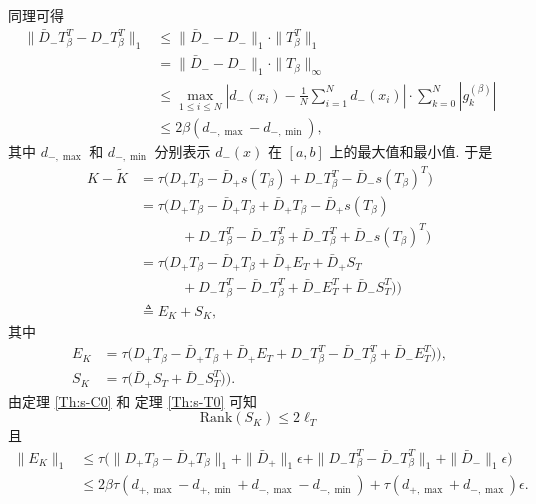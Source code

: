 \documentclass{ecnumaster}
\begin{document}
同理可得
\begin{align*}
  \|\bar{D}_- T_{\beta}^{T} - D_- T_{\beta}^{T}\|_1 
  & \leq \|\bar{D}_- - D_-\|_1\cdot \|T_{\beta}^{T}\|_1 \\
    &= \| \bar{D}_- - D_- \|_1\cdot \| T_{\beta}\|_\infty\\
    &\leq \max _{1 \leq i \leq N} 
     \left|d_{-}(x_i) - \frac{1}{N} \sum\limits _{i=1}^{N} d_{-}(x_i)\right|\cdot
        \sum\limits_{k=0}^{N} \left|g_k^{(\beta)}\right|\\
    &\leq 2\beta (d_{-,\max}-d_{-,\min}),
\end{align*}
其中 $d_{-,\max}$ 和 $d_{-,\min}$ 分别表示 $d_-(x)$
在 $[a,b]$ 上的最大值和最小值.
%
于是
\begin{align*}
  K-\tilde{K}
  & = \tau \Big(D_+ T_{\beta} - \bar{D}_+ s(T_{\beta})
         + D_- T_{\beta}^T - \bar{D}_- s(T_{\beta})^T\Big) \\
  & = \tau \Big(D_+ T_{\beta} - \bar{D}_+ T_{\beta} + \bar{D}_+ T_{\beta} - \bar{D}_+ s(T_{\beta}) \\
  & \quad\qquad  + D_- T_{\beta}^T - \bar{D}_- T_{\beta}^T + \bar{D}_- T_{\beta}^T + \bar{D}_- s(T_{\beta})^T\Big) \\
  & = \tau \Big(D_+ T_{\beta} - \bar{D}_+ T_{\beta} + \bar{D}_+ E_T + \bar{D}_+ S_T \\
  & \quad\qquad  + D_- T_{\beta}^T - \bar{D}_- T_{\beta}^T + \bar{D}_- E_T^T + \bar{D}_- S_T^T)\Big) \\
  & \triangleq E_K + S_K,
\end{align*}
其中 
\begin{align*}
  E_K & = \tau \Big(D_+ T_{\beta} - \bar{D}_+ T_{\beta} + \bar{D}_+ E_T
    + D_- T_{\beta}^T - \bar{D}_- T_{\beta}^T + \bar{D}_- E_T^T)\Big),\\
  S_K & = \tau \Big(\bar{D}_+ S_T + \bar{D}_- S_T^T)\Big).
\end{align*}
由定理 \ref{Th:s-C0} 和 定理 \ref{Th:s-T0} 可知 
$$ \mathrm{Rank}(S_K)\leq 2\ell_T $$
且 
\begin{align*}
  \|E_K\|_1 
  & \leq \tau\Big(\|D_+ T_{\beta} - \bar{D}_+ T_{\beta}\|_1
     + \|\bar{D}_+\|_1\epsilon + \|D_- T_{\beta}^T - \bar{D}_- T_{\beta}^T\|_1
     + \|\bar{D}_-\|_1\epsilon \Big) \\
  & \leq 2\beta\tau (d_{+,\max}-d_{+,\min}+d_{-,\max}-d_{-,\min})
     +\tau(d_{+,\max}+ d_{-,\max})\epsilon.
\end{align*}
\end{document}

